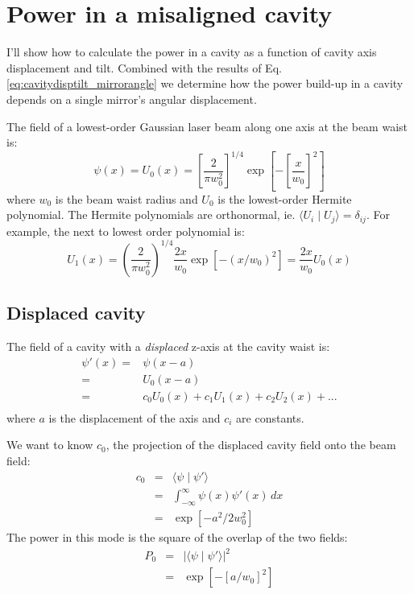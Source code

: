 \section{Power in a misaligned cavity}
\label{sec:cavitypower}
I'll show how to calculate the power in a cavity as a function of
cavity axis displacement and tilt. Combined with the results of
Eq. \ref{eq:cavitydisptilt_mirrorangle} we determine how the power
build-up in a cavity depends on a single mirror's angular
displacement.

The field of a lowest-order Gaussian laser beam along one axis at the beam waist is:
\begin{equation}
\psi(x) = U_0(x) = \left[ \frac{2}{\pi w_0^2} \right]^{1/4} \exp{\left[-\left[\frac{x}{w_0}\right]^2\right]}
\end{equation}
where $w_0$ is the beam waist radius and $U_0$ is the lowest-order
Hermite polynomial. The Hermite polynomials are orthonormal,
ie. $\langle U_i \mid U_j \rangle = \delta_{ij}$. For example, the
next to lowest order polynomial is:
\begin{equation}
U_1(x) = \left( \frac{2}{\pi w_0^2} \right)^{1/4} \frac{2x}{w_0}
\exp{[-(x/w_0)^2]} = \frac{2x}{w_0} U_0(x)
\end{equation}

\subsection{Displaced cavity}
The field of a cavity with a \emph{displaced} z-axis at the cavity waist is:
\begin{align}
\psi \prime (x) =& \psi(x-a) \\
 =& U_0(x-a) \\
 =& c_0U_0(x) + c_1 U_1(x) + c_2 U_2(x) + ...\\
\end{align}
where $a$ is the displacement of the axis and $c_i$ are constants.

We want to know $c_0$, the projection of the displaced cavity field onto the beam field: 
\begin{eqnarray}
c_0 &=& \langle \psi \mid \psi \prime \rangle \\
&=& \int_{-\infty}^\infty \psi(x) \psi \prime(x) \, dx \\
 &=& \exp{[-a^2/2 w_0^2]}
\label{eq:c_0}
\end{eqnarray}
The power in this mode is the square of the overlap of the two fields: 
\begin{eqnarray}
P_0&=& \left| \langle \psi \mid \psi \prime \rangle \right| ^2\\ 
&=& \exp{[-[a/w_0]^2]} 
\end{eqnarray}

